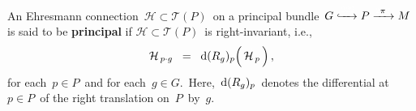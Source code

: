 

\begin{definition}
\mbox{}
\vskip -0.05cm
\noindent
An Ehresmann connection \,$\mathcal{H} \subset \mathcal{T}(P)$\, on a principal bundle
\,$G \xhookrightarrow{{\color{white}222}} P \xrightarrow{{\color{white}2}\pi{\color{white}2}} M$\,
is said to be \textbf{principal} if \;$\mathcal{H} \subset \mathcal{T}(P)$\, is right-invariant, i.e.,
\begin{equation*}
\mathcal{H}_{\,p \cdot g}
\;\; = \;\;
	\d(R_{g})_{p}\!\left(\,\overset{{\color{white}.}}{\mathcal{H}_{\,p}}\,\right),
\end{equation*}
for each \,$p \in P$\, and for each \,$g \in G$.\,
Here, \,$\textnormal{d}(R_{g})_{p}$\, denotes the differential at \,$p \in P$\,
of the right translation on \,$P$\, by \,$g$.\, 
\end{definition}


